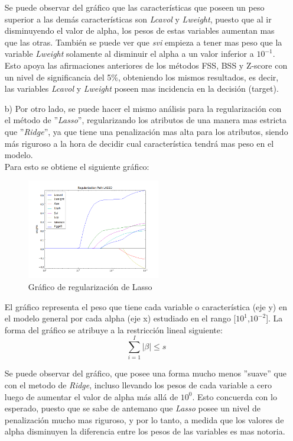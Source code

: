 \documentclass[10pt]{article}
\begin{document}
\begin{itemize}
Se puede observar del gráfico que las características que poseen un peso superior a las demás características son \textit{Lcavol} y \textit{Lweight}, puesto que al ir disminuyendo el valor de alpha, los pesos de estas variables aumentan mas que las otras. También se puede ver que \textit{svi} empieza a tener mas peso que la variable \textit{Lweight} solamente al disminuir el alpha a un valor inferior a $10^{-1}$. Esto apoya las afirmaciones anteriores de los métodos FSS, BSS y Z-score con un nivel de significancia del 5\%, obteniendo los mismos resultados, es decir, las variables \textit{Lcavol} y \textit{Lweight} poseen mas incidencia en la decisión (target).


\item[b)] Por otro lado, se puede hacer el mismo análisis para la regularización con el método de ''\textit{Lasso}'', regularizando los atributos de una manera mas estricta que ''\textit{Ridge}'', ya que tiene una penalización mas alta para los atributos, siendo más riguroso a la hora de decidir cual característica tendrá mas peso en el modelo.\\

Para esto se obtiene el siguiente gráfico:
\begin{figure}[!htb]
    \centering
    \includegraphics[width=0.55\textwidth]{images/regularization_lasso}
    \caption{Gráfico de regularización de Lasso}
    \label{lasso}
\end{figure}

El gráfico representa el peso que tiene cada variable o característica (eje y) en el modelo general por cada alpha (eje x) estudiado en el rango [$10^1$,$10^{-2}$]. La forma del gráfico se atribuye a la restricción lineal siguiente: \\

\begin{equation}
\sum_{i=1}^I |\beta| \leq s
\end{equation}

Se puede observar del gráfico, que posee una forma mucho menos ''suave'' que con el metodo de \textit{Ridge}, incluso llevando los pesos de cada variable a cero luego de aumentar el valor de alpha más allá de $10^0$. Esto concuerda con lo esperado, puesto que se sabe de antemano que \textit{Lasso} posee un nivel de penalización mucho mas riguroso, y por lo tanto, a medida que los valores de alpha disminuyen la diferencia entre los pesos de las variables es mas notoria.\\


\end{itemize}
\end{document}
